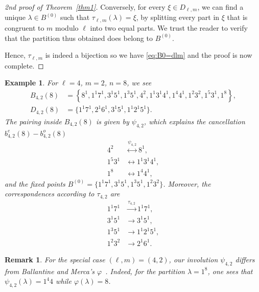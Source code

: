 \documentclass[12pt,reqno]{amsart}
\numberwithin{equation}{section}
\newtheorem{Example}{Example}[section]
\newtheorem{remark}[Theorem]{Remark}
\begin{document}
\begin{proof}[2nd proof of Theorem~\ref{thm1}]
Conversely, for every $\xi \in D_{\ell,m}$, we can find a unique $\lambda \in B^{(0)}$ such that $\tau_{\ell,m}(\lambda)=\xi$, by splitting every part in $\xi$ that is congruent to $m$ modulo $\ell$ into two equal parts. We trust the reader to verify that the partition thus obtained does belong to $B^{(0)}$. 

Hence, $\tau_{\ell,m}$ is indeed a bijection so we have \eqref{eq:B0=dlm} and the proof is now complete.
\end{proof}
\begin{Example}
	For $\ell=4$, $m=2$, $n=8$, we see
	\begin{align*}
		B_{4,2}(8) &=
		\left\{ 
		8^{1}, 1^{1}7^{1}, 3^{1}5^{1}, 1^{3}5^{1}, 4^{2}, 1^{1}3^{1}4^{1}, 1^{4}4^{1}, 
		1^{2}3^{2}, 1^{5}3^{1}, 1^{8}
		\right\}, \\
		D_{4,2}(8) &=\{1^{1}7^{1}, 2^{1}6^{1}, 3^{1}5^{1}, 1^{1}2^{1}5^{1}\}.
	\end{align*}
	The pairing inside $B_{4,2}(8)$ is given by $\psi_{4,2}$, which explains the cancellation $b^e_{4,2}(8)-b^o_{4,2}(8)$
	\begin{align*}
		4^{2} &\overset{\psi_{4,2}}{\longleftrightarrow} 8^{1},\\
		1^{5}3^{1} &\longleftrightarrow 1^{1}3^{1}4^{1},\\
		1^{8} &\longleftrightarrow 1^{4}4^{1},
	\end{align*}
	and the fixed points $B^{(0)}=\{1^{1}7^{1}, 3^{1}5^{1}, 1^{3}5^{1}, 1^{2}3^{2}\}$. Moreover, the correspondences according to $\tau_{4,2}$ are
	\begin{align*}
		1^{1}7^{1} &\overset{\tau_{4,2}}{\longrightarrow} 1^{1}7^{1},\\
		3^{1}5^{1} &\longrightarrow 3^{1}5^{1},\\
		1^{3}5^{1} &\longrightarrow 1^{1}2^{1}5^{1},\\
		1^{2}3^{2} &\longrightarrow 2^{1}6^{1}.
	\end{align*}
\end{Example}



\begin{remark}
 For the special case $(\ell,m)=(4,2)$,	our involution $\psi_{4,2}$ differs from Ballantine and Merca's $\varphi$~\cite[Theorem~1.1(i)]{ballantine20234}. Indeed, for the partition $\lambda=1^8$, one sees that $\psi_{4,2}(\lambda)=1^4 4$ while $\varphi(\lambda)=8$.
\end{remark}
\end{document}
